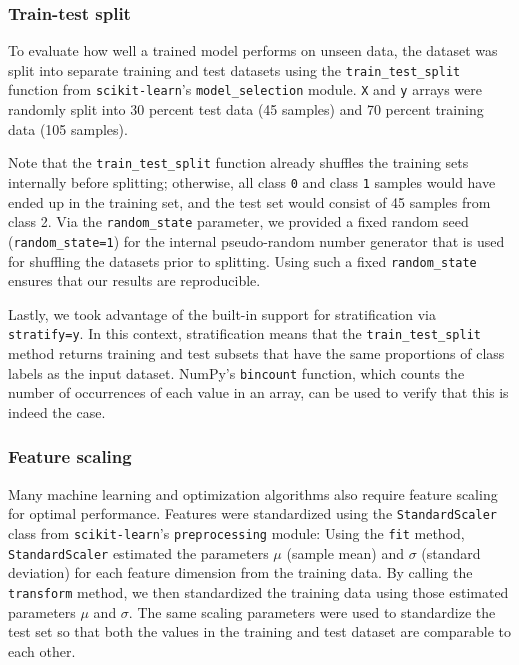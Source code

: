 \documentclass[11pt]{article}
\begin{document}
    \subsubsection{Train-test split} \label{subsec:preproc_train_test_split}

    To evaluate how well a trained model performs on unseen data, the dataset was split into separate training and test datasets using the \texttt{train\_test\_split} function from \texttt{scikit-learn}'s \texttt{model\_selection} module.
    \texttt{X} and \texttt{y} arrays were randomly split into 30 percent test data (45 samples) and 70 percent training data (105 samples).

    Note that the \texttt{train\_test\_split} function already shuffles the training sets internally before splitting;
    otherwise, all class \texttt{0} and class \texttt{1} samples would have ended up in the training set, and the test set would consist of 45 samples from class 2.
    Via the \texttt{random\_state} parameter, we provided a fixed random seed (\texttt{random\_state=1}) for the internal pseudo-random number generator that is used for shuffling the datasets prior to splitting.
    Using such a fixed \texttt{random\_state} ensures that our results are reproducible.

    Lastly, we took advantage of the built-in support for stratification via \texttt{stratify=y}.
    In this context, stratification means that the \texttt{train\_test\_split} method returns training and test subsets that have the same proportions of class labels as the input dataset.
    NumPy's \texttt{bincount} function, which counts the number of occurrences of each value in an array, can be used to verify that this is indeed the case.

    \subsubsection{Feature scaling} \label{subsec:preproc_feature_scaling}

    Many machine learning and optimization algorithms also require feature scaling for optimal performance.
    Features were standardized using the \texttt{StandardScaler} class from \texttt{scikit-learn}'s \texttt{preprocessing} module:
    Using the \texttt{fit} method, \texttt{StandardScaler} estimated the parameters $\mu$ (sample mean) and $\sigma$ (standard deviation) for each feature dimension from the training data.
    By calling the \texttt{transform} method, we then standardized the training data using those estimated parameters $\mu$ and $\sigma$.
    The same scaling parameters were used to standardize the test set so that both the values in the training and test dataset are comparable to each other.
\end{document}

